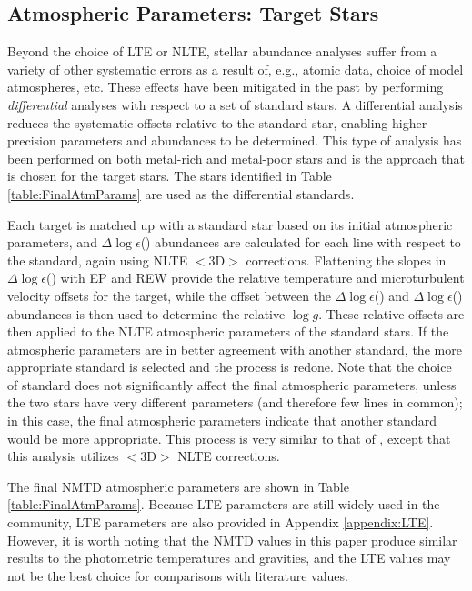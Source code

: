 \documentclass[preprint]{aastex61}
\begin{document}
\subsection{Atmospheric Parameters: Target Stars}\label{subsec:TargetAtmParams}
Beyond the choice of LTE or NLTE, stellar abundance analyses suffer
from a variety of other systematic errors as a result of, e.g., atomic
data, choice of model atmospheres, etc.  These effects have been
mitigated in the past by performing {\it differential} analyses with
respect to a set of standard stars.  A differential
  analysis reduces the systematic offsets relative to the standard
  star, enabling higher precision parameters and abundances to be
  determined.  This type of analysis has been performed on both
metal-rich
\citep{Fulbright2006,Fulbright2007,KochMcWilliam2008,McWilliam2013,Sakari2017}
and metal-poor stars \citep{OMalley2017,Reggiani2016,Reggiani2017} and
is the approach that is chosen for the target stars.  The stars
identified in Table \ref{table:FinalAtmParams} are used as the
differential standards.

Each target is matched up with a standard star based on its initial
atmospheric parameters, and $\Delta \log \epsilon$()
abundances are calculated for each line with respect to the standard,
again using NLTE $<$3D$>$ corrections.  Flattening the slopes in 
$\Delta \log \epsilon$() with EP and REW provide the
relative temperature and microturbulent velocity offsets for the
target, while the offset between the $\Delta
\log\epsilon$() and $\Delta \log \epsilon$()
abundances is then used to determine the relative $\log g$.  These
relative offsets are then applied to the NLTE atmospheric parameters
of the standard stars.  If the atmospheric parameters are
  in better agreement with another standard, the more appropriate
  standard is selected and the process is redone.  Note that the
  choice of standard does not significantly affect the final
  atmospheric parameters, unless the two stars have very different
  parameters (and therefore few lines in common); in this case, the
  final atmospheric parameters indicate that another standard would be
  more appropriate. This process is very similar to that of
\citet{OMalley2017}, except that this analysis utilizes $<$3D$>$ NLTE
corrections.

The final NMTD atmospheric parameters are shown in Table
\ref{table:FinalAtmParams}.  Because LTE parameters are still widely
used in the community, LTE parameters are also provided in Appendix
\ref{appendix:LTE}.  However, it is worth noting that the NMTD values
in this paper produce similar results to the photometric temperatures
and gravities, and the LTE values may not be the best choice for
comparisons with literature values.
\end{document}
